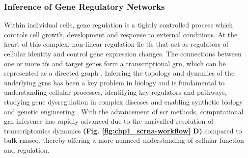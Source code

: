 \subsubsection{Inference of Gene Regulatory Networks}
\label{subsubsec:chp1_int_grn}
\par Within individual cells, gene regulation is a tightly controlled process which controls cell growth, development and response to external conditions. At the heart of this complex, non-linear regulation lie \glspl{tf} that act as regulators of cellular identity and control gene expression changes. The connections between one or more \glspl{tf} and target genes form a transcriptional \gls{grn}, which can be represented as a directed graph \textbf{\cite{skok_gibbs_high-performance_2022}}. Inferring the topology and dynamics of the underlying \glspl{grn} has been a key problem in biology and is fundamental to understanding cellular processes, identifying key regulators and pathways, studying gene dysregulation in complex diseases and enabling synthetic biology and genetic engineering \textbf{\cite{lueckenmalte_d_current_2019,skok_gibbs_high-performance_2022,huang_scgrn_2024}}. With the advancement of \gls{scr} methods, computational \gls{grn} inference has rapidly advanced due to the unrivalled resolution of transcriptomics dynamics \textbf{(Fig. \ref{fig:chp1_scrna-workflow} D)} \textbf{\cite{kim_review_2024}} compared to bulk \gls{rnaseq}, thereby offering a more nuanced understanding of cellular function and regulation.\\




